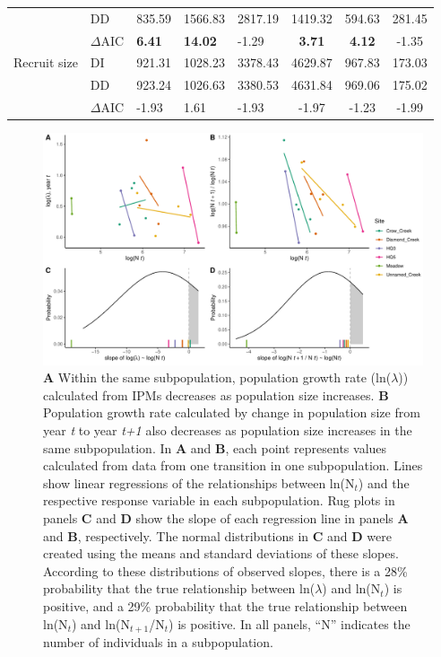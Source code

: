 \documentclass[12pt, letterpaper]{article}
\begin{document}
\begin{table}[h]
\begin{spacing}{1.2}
\begin{tabular}{l l p{} p{} p{}ccc}
& DD &                                   835.59 &  1566.83 & 2817.19 & 1419.32 & 594.63 & 281.45 \\
 & $\Delta$AIC &                         \textbf{6.41} &    \textbf{14.02} &   -1.29 &   \textbf{3.71} &    \textbf{4.12} &   -1.35 \\ 
\rowcolor[gray]{.95} Recruit size & DI & 921.31 &  1028.23 & 3378.43 & 4629.87 & 967.83 & 173.03 \\
\rowcolor[gray]{.95} & DD &              923.24 &  1026.63 & 3380.53 & 4631.84 & 969.06 & 175.02 \\ 
\rowcolor[gray]{.95} & $\Delta$AIC &     -1.93 &   1.61 &   -1.93 &   -1.97 &   -1.23 &  -1.99 \\
\hline
\end{tabular}
\end{spacing}
\end{table}

\begin{figure}[h]
  \centering
  \includegraphics[width=.8\textwidth]{figures/densityDependenceFigure.pdf}
  \caption{\textbf{A} Within the same subpopulation, population growth rate (ln($\lambda$)) calculated from IPMs decreases as population size increases. \textbf{B} Population growth rate calculated by change in population size from year \textit{t} to year \textit{t+1} also decreases as population size increases in the same subpopulation. In \textbf{A} and \textbf{B}, each point represents values calculated from data from one transition in one subpopulation. Lines show linear regressions of the relationships between ln(N$_t$) and the respective response variable in each subpopulation. Rug plots in panels \textbf{C} and \textbf{D} show the slope of each regression line in panels \textbf{A} and \textbf{B}, respectively. The normal distributions in \textbf{C} and \textbf{D} were created using the means and standard deviations of these slopes. According to these distributions of observed slopes, there is a 28\% probability that the true relationship between ln($\lambda$) and ln(N$_t$) is positive, and a 29\% probability that the true relationship between ln(N$_t$) and ln(N$_{t+1}$/N$_t$) is positive. In all panels, “N” indicates the number of individuals in a subpopulation. }
  \label{fig:DDFig}
\end{figure} 
\end{document}
